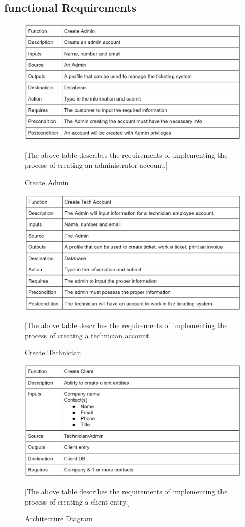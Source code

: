 \documentclass[letterpaper]{article}
\begin{document}
\subsection{functional Requirements}
\begin{figure}[htbp]
  \includegraphics[scale = .5]{CreateAdmin}
  \caption{Create Admin}[The above table describes the requirements of implementing the process of creating an administrator account.]
  \centering
\end{figure}

\begin{figure}[htbp]
  \includegraphics[scale = .5]{CreateTech}
  \caption{Create Technician}[The above table describes the requirements of implementing the process of creating a technician account.]
  \centering
\end{figure}

\begin{figure}[htbp]
  \includegraphics[scale = .5]{CreateClient}
  \caption{Architecture Diagram}[The above table describes the requirements of implementing the process of creating a client entry.]
  \centering
\end{figure}
\end{document}
